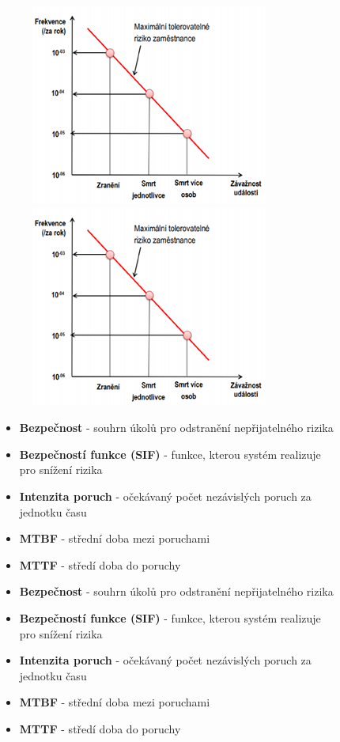 \begin{figure}[h]
\begin{figure}[h]
  \begin{center}
    \includegraphics[scale = 1]{img/Picture20.png}
  \end{center}
    \begin{center}
        \includegraphics[scale = 1]{img/Picture20.png}
    \end{center}
\end{figure}

\begin{itemize}
  \item \textbf{Bezpečnost} - souhrn úkolů pro odstranění nepřijatelného rizika
  \item \textbf{Bezpečností funkce (SIF)} - funkce, kterou systém realizuje pro snížení rizika
  \item \textbf{Intenzita poruch} - očekávaný počet nezávislých poruch za jednotku času
  \item \textbf{MTBF} - střední doba mezi poruchami
  \item \textbf{MTTF} - středí doba do poruchy  
    \item \textbf{Bezpečnost} - souhrn úkolů pro odstranění nepřijatelného rizika
    \item \textbf{Bezpečností funkce (SIF)} - funkce, kterou systém realizuje pro snížení rizika
    \item \textbf{Intenzita poruch} - očekávaný počet nezávislých poruch za jednotku času
    \item \textbf{MTBF} - střední doba mezi poruchami
    \item \textbf{MTTF} - středí doba do poruchy
\end{itemize}


\end{figure}
